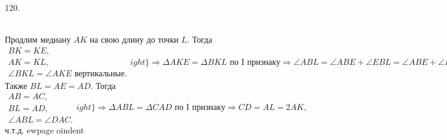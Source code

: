 120. \begin{figure}[ht!]
\end{figure}\\
Продлим медиану $AK$ на свою длину до точки $L.$ Тогда $\left.\begin{array}{l}BK=KE,\\
AK=KL,\\
\angle BKL=\angle AKE\text{ вертикальные.} \end{array}
ight\}\Rightarrow \Delta AKE=\Delta BKL\text{ по I признаку}\Rightarrow
\angle ABL=\angle ABE+\angle EBL=\angle ABE+\angle BEA=\angle DAC.$ Также  $BL=AE=AD.$ Тогда
$\left.\begin{array}{l}AB=AC,\\
BL=AD,\\
\angle ABL=\angle DAC. \end{array}
ight\}\Rightarrow \Delta ABL=\Delta CAD\text{ по I признаку}\Rightarrow CD=AL=2AK,$ ч.т.д.
ewpage
oindent
